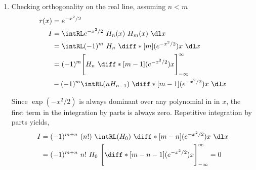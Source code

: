 \begin{enumerate}
\begin{enumerate}
              \item Checking orthogonality on the real line, assuming $ n < m $
                    \begin{align}
                        r(x) & = e^{-x^2/2}                                      \\
                        I    & = \intRL e^{-x^2/2}\ H_n(x)\ H_m(x)
                        \ \dl x                                                  \\
                             & = \intRL (-1)^m\ H_n
                        \ \diff*[m]{(e^{-x^2/2})}{x}\ \dl x                      \\
                             & = (-1)^m \Bigg[ H_n\ \diff*[m-1]{(e^{-x^2/2})}{x}
                        \Bigg]_{-\infty}^{\infty}                                \\
                             & - (-1)^m \intRL
                        (n H_{n-1})\ \diff*[m-1]{(e^{-x^2/2})}{x}\ \dl x
                    \end{align}

                    Since $ \exp(-x^2/2) $ is always dominant over any polynomial in
                    in $ x $, the first term in the integration by parts is always zero.
                    Repetitive integration by parts yields,
                    \begin{align}
                        I & = (-1)^{m+n}\ (n!)\ \intRL
                        (H_{0})\ \diff*[m-n]{(e^{-x^2/2})}{x}\ \dl x    \\
                          & = (-1)^{m+n}\ n!\ H_0\ \Bigg[ \diff*[m-n-1]
                            {(e^{-x^2/2})}{x} \Bigg]_{-\infty}^{\infty} = 0
                    \end{align}


\end{enumerate}
\end{enumerate}
